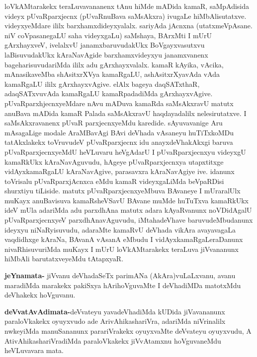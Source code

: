 \begin{artha}
loVkAMtarakekx teraLuvavananenx tAnu hiMde mADida kamaR, saMpAdisida videyx pUvaRparxjecnx (pUvaRnuBava saMsAkxra) ivugaLe hiMbAlisutatxve. videyxyeMdare ililx barxhamxdideyxyalalx. sariyAda jAcnxna (utatxmeVpAsane. niV coVpasanegaLU saha videyxgaLu) saMshaya, BArxMti I mUrU gArxhayxveV, ivelalxvU janamxbaruvudakUkx BoVgayxvasutxvu laBisuvudakUkx kAraNavAgide barxhamxvideyxyu janamxvanenx bageharisuvudariMda ililx adu gArxhayxvalalx.  kamaR kAyika, vAcika, mAnasikaveMba shAsitxrXVya kamaRgaLU, ashAsitxrXyavAda vAda kamaRgaLU ililx gArxhayxvAgive. elAlx bageya daqSATxthaR, adaqSATxvuvAda kamaRgaLU kamaRpadadiMda gArxhayxvAgive. pUvaRparxhjecnxyeMdare nAvu mADuva kamaRda saMsAkxravU matutx anuBava mADida kamaR Palada saMsAkxravU haqdayadalilx nelesirutatxve. I saMsAkxravanenx pUvaR parxjecnxyeMdu karedide. sAyuvavanige Aru mAsagaLige modale AraMBavAgi BAvi deVhada vAsaneyu huTiTxkoMDu tatAkxlakekx toVruvudeV pUvaRparxjecnx idu anayxdeVhakAkxgi baruva pUvaRparxjecnxyeMdU heVLuvaru heVgAdarU I pUvaRparxjecnxyu videyxgU kamaRkUkx kAraNavAguvudu, hAgeye pUvaRparxjecnxya utapxtitxge vidAyxkamaRgaLU kAraNavAgive, parasavxra kAraNavAgiye ive. idanunx toVrisalu pUvaRparxjAcnxca eMdu kamaR videyxgaLiMda beVpaRDisi shurxtiyu tiLiside. matutx pUvaRparxjecnxyeMbuva BAvaneye I mUraralUlx muKayx anuBavisuva kamaRsheVSavU BAvane muMde huTuTxva kamaRkUkx ideV mUla adariMda adu parxdhAna matutx adara kAyaRvanunx noVDidAgalU pUvaRparxjecnxyeV parxdhAnavAguvudu, iMtahadeVhave baruvudeMbudanunx ideyxyu niNaRyisuvudu, adaraMte kamaRvU deVhada vikAra avayavagaLa vaqdidhxge kAraNa, BAvanA vAsanA eMbudu I vidAyxkamaRgaLeraDanunx nivaRhisuvuriMda muKayx I mUrU loVkAMtarakekx teraLuva jiVvananunx hiMbAli barutatxveyeMdu tAtapxyaR.
\end{artha}



\begin{artha}
\textbf{jeYnamata-} jiVvanu deVhadaSeTx parimANa (AkAra)vuLaLxvanu, avanu maradiMda marakekx pakiSxya hArihoVguvaMte I deVhadiMDa matotxMdu deVhakekx hoVguvanu.
\end{artha}

\begin{artha}
\textbf{deVvatAvAdimata-}deVvateyu yavadeVhadiMda kUDida jiVavananunx paraloVkakekx oyuyxvudo ade ArivAhikashariVra, adariMda niVrinalilx nwkeyiMda manuSananunx parariVrakekx oyuyxvaMte deVvateyu oyuyxvudu, A AtivAhikashariVradiMda paraloVkakekx jiVvAtamxnu hoVguvaneMdu heVLuvavara mata.
\end{artha}

